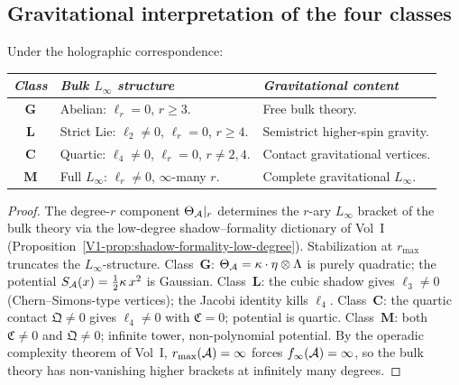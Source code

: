 \subsection{Gravitational interpretation of the four classes}

\begin{theorem}
\ClaimStatusProvedHere
{}
Under the holographic correspondence:
\begin{center}
\small
\renewcommand{\arraystretch}{1.25}
\begin{tabular}{c@{\quad}l@{\quad}l}
\toprule
\emph{Class} & \emph{Bulk $L_\infty$ structure} &
\emph{Gravitational content} \\
\midrule
$\mathbf{G}$ &
 Abelian: $\ell_r = 0$, $r \geq 3$. &
 Free bulk theory. \\
$\mathbf{L}$ &
 Strict Lie: $\ell_2 \neq 0$, $\ell_r = 0$, $r \geq 4$. &
 Semistrict higher-spin gravity. \\
$\mathbf{C}$ &
 Quartic: $\ell_4 \neq 0$, $\ell_r = 0$, $r \neq 2,4$. &
 Contact gravitational vertices. \\
$\mathbf{M}$ &
 Full $L_\infty$: $\ell_r \neq 0$, $\infty$-many $r$. &
 Complete gravitational $L_\infty$. \\
\bottomrule
\end{tabular}
\end{center}
\end{theorem}

\begin{proof}
The degree-$r$ component $\Theta_{\mathcal{A}}|_r$ determines the $r$-ary
$L_\infty$ bracket of the bulk theory via
the low-degree shadow--formality dictionary of Vol~I
\textup{(}Proposition~\textup{\ref*{V1-prop:shadow-formality-low-degree}}\textup{)}.
Stabilization at $r_{\max}$ truncates the $L_\infty$-structure.
Class~$\mathbf{G}$: $\Theta_{\mathcal{A}} = \kappa \cdot \eta \otimes
\Lambda$ is purely quadratic; the potential
$S_{\mathcal{A}}(x) = \frac{1}{2}\kappa\,x^2$ is Gaussian.
Class~$\mathbf{L}$: the cubic shadow gives $\ell_3 \neq 0$
(Chern--Simons-type vertices); the Jacobi identity kills $\ell_4$.
Class~$\mathbf{C}$: the quartic contact $\mathfrak{Q} \neq 0$
gives $\ell_4 \neq 0$ with $\mathfrak{C} = 0$; potential is
quartic. Class~$\mathbf{M}$: both $\mathfrak{C} \neq 0$ and
$\mathfrak{Q} \neq 0$; infinite tower, non-polynomial potential.
By the operadic complexity theorem of Vol~I,
$r_{\max}(\mathcal{A}) = \infty$ forces $f_\infty(\mathcal{A}) = \infty$, so the
bulk theory has non-vanishing higher brackets at infinitely many degrees.
\end{proof}


